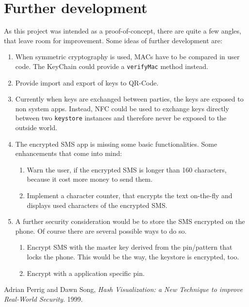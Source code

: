 \documentclass[a4paper]{scrartcl}
\begin{document}
\section{Further development}
	As this project was intended as a proof-of-concept, there are quite a few angles, that leave room for improvement. Some ideas of further development are:
	\begin{enumerate}
		\item When symmetric cryptography is used, MACs have to be compared in user code. The KeyChain could provide a \texttt{verifyMac} method instead.
		\item Provide import and export of keys to QR-Code.
		\item Currently when keys are exchanged between parties, the keys are exposed to non system apps. Instead, NFC could be used to exchange keys directly between two \texttt{keystore} instances and therefore never be exposed to the outside world.
		\item The encrypted SMS app is missing some basic functionalities. Some enhancements that come into mind:
		\begin{enumerate}
			\item Warn the user, if the encrypted SMS is longer than 160 characters, because it cost more money to send them.
			\item Implement a character counter, that encrypts the text on-the-fly and displays used characters of the encrypted SMS.
		\end{enumerate}
		\item A further security consideration would be to store the SMS encrypted on the phone. Of course there are several possible ways to do so.
		\begin{enumerate}
			\item Encrypt SMS with the master key derived from the pin/pattern that locks the phone. This would be the way, the keystore is encrypted, too.
			\item Encrypt with a application specific pin.
		\end{enumerate}
	\end{enumerate}

\begin{thebibliography}{9}
		Adrian Perrig and Dawn Song,
		{\em Hash Visualization: a New Technique to improve Real-World Security}.
		1999.
\end{thebibliography}
\end{document}
